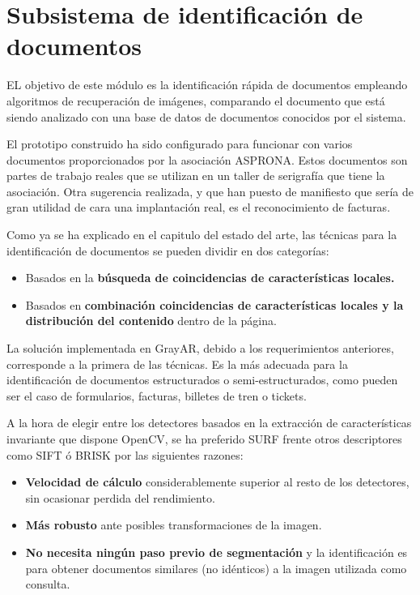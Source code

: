 \section{Subsistema de identificación de documentos}
EL objetivo de este módulo es la identificación rápida de documentos empleando algoritmos de
recuperación de imágenes, comparando el documento que está siendo analizado con una base de datos de
documentos conocidos por el sistema.

El prototipo construido ha sido configurado para funcionar con varios documentos proporcionados
por la asociación ASPRONA. Estos documentos son partes de trabajo reales que se utilizan en un
taller de serigrafía que tiene la asociación. Otra sugerencia realizada, y que han puesto de
manifiesto que sería de gran utilidad de cara una implantación real, es el reconocimiento de facturas.

Como ya se ha explicado en el capitulo del estado del arte, las técnicas para la identificación de
documentos se pueden dividir en dos categorías:

\begin{itemize}
\item Basados en la \textbf{búsqueda de coincidencias de características locales.}
\item Basados en \textbf{combinación coincidencias de características locales y la distribución del contenido} dentro de la página.
\end{itemize}

La solución implementada en GrayAR, debido a los requerimientos anteriores, corresponde a la primera
de las técnicas. Es la más adecuada para la identificación de documentos estructurados o
semi-estructurados, como pueden ser el caso de formularios, facturas, billetes de tren o tickets.

A la hora de elegir entre los detectores basados en la extracción de características invariante que
dispone OpenCV, se ha preferido SURF frente otros descriptores como SIFT ó BRISK por las siguientes razones:

\begin{itemize}
\item \textbf{Velocidad de cálculo} considerablemente superior al resto de los detectores, sin ocasionar perdida del rendimiento.
\item \textbf{Más robusto} ante posibles transformaciones de la imagen.
\item \textbf{No necesita ningún paso previo de segmentación} y la identificación es para obtener documentos similares (no
idénticos) a la imagen utilizada como consulta.
\end{itemize}

